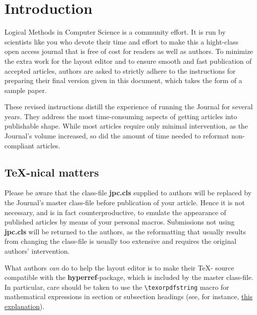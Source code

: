 \documentclass{CSLM} %
\theoremstyle{plain}\newtheorem{satz}[thm]{Satz} %
\begin{document}
\maketitle

\section*{Introduction}\label{S:one}

  Logical Methods in Computer Science is a community effort. It is run
  by scientists like you who devote their time and effort to make this
  a hight-class open access journal that is free of cost for readers
  as well as authors.  To minimize the extra work for the layout
  editor and to ensure smooth and fast publication of accepted
  articles, authors are asked to strictly adhere to the instructions
  for preparing their final version given in this document, which
  takes the form of a sample paper.

  These revised instructions distill the experience of running the
  Journal for several years.  They address the most time-consuming
  aspects of getting articles into publishable shape.  While most
  articles require only minimal intervention, as the Journal's volume
  increased, so did the amount of time needed to reformat
  non-compliant articles.

\subsection*{\TeX-nical matters}

  Please be aware that the class-file {\bf jpc.cls} supplied to 
  authors will be replaced by the Journal's master class-file before
  publication of your article.  Hence it is not necessary, and is in
  fact counterproductive, to emulate the appearance of published
  articles by means of your personal macros.  Submissions not using
  {\bf jpc.cls} will be returned to the authors, as the reformatting
  that usually results from changing the class-file is usually too
  extensive and requires the original authors' intervention.

  What authors \emph{can} do to help the layout editor is to make
  their \TeX- source compatible with the {\bf hyperref}-package, which
  is included by the master class-file.  In particular, care should be
  taken to use the \texttt{\textbackslash texorpdfstring} macro for
  mathematical expressions in section or subsection headings (see, for
  instance, \href{http://www.fauskes.net/nb/latextips/#hyperref}{this
    explanation}).  
\end{document}
